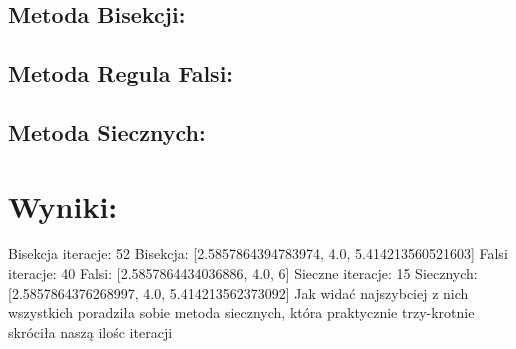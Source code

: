 \documentclass[12pt]{article}
\begin{document}
\subsection{Metoda Bisekcji:}
\subsection{Metoda Regula Falsi:}
\subsection{Metoda Siecznych:}
\section{Wyniki:}
Bisekcja iteracje:  52\newline
Bisekcja: [2.5857864394783974, 4.0, 5.414213560521603]\newline
Falsi iteracje:  40\newline
Falsi:  [2.5857864434036886, 4.0, 6]\newline
Sieczne iteracje:  15\newline
Siecznych:  [2.5857864376268997, 4.0, 5.414213562373092]\newline
Jak widać najszybciej z nich wszystkich poradziła sobie metoda siecznych, która praktycznie trzy-krotnie skróciła naszą ilośc iteracji
\end{document}
